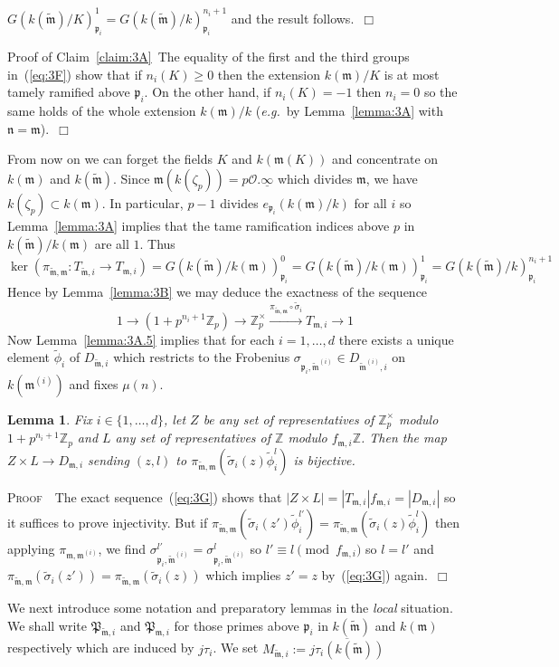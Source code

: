 \documentclass[12pt]{article}
\newtheorem{lemma}{Lemma}[section]
\newcounter{rem}[section]%
\newcommand{\bbZ}{\ensuremath{\mathbb{Z}}}
\newcommand{\beql}[1]{\begin{equation}\label{#1}}
\newcommand{\bPf}{\noindent \textsc{Proof\ }}
\newcommand{\cO}{\ensuremath{\mathcal{O}}}
\newcommand{\eeq}{\end{equation}}
\newcommand{\eg}{\emph{e.g.}}
\newcommand{\ePf}{\hspace*{\fill}~$\Box$\vertsp\par}%
\newcommand{\fm}{\ensuremath{\mathfrak{m}}}
\newcommand{\fn}{\ensuremath{\mathfrak{n}}}
\newcommand{\fp}{\ensuremath{\mathfrak{p}}}
\newcommand{\fP}{\ensuremath{\mathfrak{P}}}
\newcommand{\refeq}[1]{~(\ref{eq:#1})}
\newcommand{\rem}{\refstepcounter{rem}\noindent{\sc Remark \therem}}%
\renewcommand{\therem}{\thesection.\arabic{rem}}
\newcommand{\vertsp}{\vspace{1ex}}
\newcommand{\tfm}{\ensuremath{{\tilde{\fm}}}}
\newcommand{\Tmi}{\ensuremath{T_{\fm,i}}}
\newcommand{\Ttmi}{\ensuremath{T_{\tfm,i}}}
\newcommand{\tphi}{\ensuremath{\tilde{\phi}}}
\newcommand{\tsigma}{\ensuremath{\tilde{\sigma}}}
\newcommand{\uinf}{\ensuremath{{\underline{\infty}}}}
\begin{document}
$G(k(\tfm)/K)^1_{\fp_i}=G(k(\tfm)/k)^{n_i+1}_{\fp_i}$ and the result follows.\ePf
\noindent
{\sc Proof of Claim~\ref{claim:3A}}\
The equality of the first and the third groups in\refeq{3F} show that
if $n_i(K)\geq 0$ then the extension $k(\fm)/K$ is at most tamely ramified above $\fp_i$.
On the other hand, if $n_i(K)=-1$ then $n_i=0$ so the same holds of the whole extension
$k(\fm)/k$ (\eg\ by Lemma~\ref{lemma:3A} with $\fn=\fm$).\ePf
\noindent From now on we can forget the fields $K$ and $k(\fm(K))$ and concentrate
on $k(\fm)$ and $k(\tfm)$. Since $\fm(k(\zeta_p))=p\cO.\uinf$
which divides $\fm$, we have $k(\zeta_p)\subset k(\fm)$. In particular, $p-1$ divides
$e_{\fp_i}(k(\fm)/k)$ for all $i$ so
Lemma~\ref{lemma:3A} implies that the tame ramification
indices above $p$ in $k(\tfm)/k(\fm)$ are all $1$. Thus
\[
\ker(\pi_{\tfm,\fm}:\Ttmi\rightarrow\Tmi)=
G(k(\tfm)/k(\fm))^0_{\fp_i}=G(k(\tfm)/k(\fm))^1_{\fp_i}=
G(k(\tfm)/k)^{n_i+1}_{\fp_i}
\]
Hence by Lemma~\ref{lemma:3B} we may deduce the exactness of the sequence
\beql{eq:3G}
1\rightarrow (1+p^{n_i+1}\bbZ_p)\longrightarrow \bbZ_p^\times
\stackrel{\pi_{\tfm,\fm}\circ\tsigma_i}{\longrightarrow} \Tmi\rightarrow 1
\eeq
Now
Lemma~\ref{lemma:3A.5} implies that for each $i=1,\ldots,d$ there exists a unique element
$\tphi_i$ of $D_{\tfm,i}$ which restricts to
the Frobenius $\sigma_{\fp_i,\tfm^{(i)}}\in D_{\tfm^{(i)},i}$ on $k(\fm^{(i)})$
and fixes $\mu(n)$.
\begin{lemma}\label{lemma:3C.5}
Fix $i\in\{1,\ldots,d\}$, let $Z$ be any set of representatives
of $\bbZ_p^\times$ modulo $1+p^{n_i+1}\bbZ_p$ and $L$ any set of
representatives of  $\bbZ$ modulo $f_{\fm,i}\bbZ$.
Then the map $Z\times L\rightarrow D_{\fm,i}$ sending
$(z,l)$ to $\pi_{\tfm,\fm}(\tsigma_i(z)\tphi_i^l)$ is bijective.
\end{lemma}
\bPf\ The exact sequence\refeq{3G} shows that
$|Z\times L|=|\Tmi|f_{\fm,i}=|D_{\fm,i}|$ so it suffices to prove injectivity.
But if $\pi_{\tfm,\fm}(\tsigma_i(z')\tphi_i^{l'})=\pi_{\tfm,\fm}(\tsigma_i(z)\tphi_i^l)$ then
applying $\pi_{\fm,\fm^{(i)}}$, we find $\sigma_{\fp_i,\tfm^{(i)}}^{l'}=\sigma_{\fp_i,\tfm^{(i)}}^l$
so $l'\equiv l\pmod{f_{\fm,i}}$ so $l=l'$ and
$\pi_{\tfm,\fm}(\tsigma_i(z'))=\pi_{\tfm,\fm}(\tsigma_i(z))$
which implies $z'=z$ by\refeq{3G} again.\ePf
\noindent We next introduce some notation and preparatory lemmas
in the \emph{local} situation. We shall write $\fP_{\tfm,i}$ and
$\fP_{\fm,i}$ for those primes above $\fp_i$ in $k(\tfm)$ and $k(\fm)$ respectively
which are induced by $j\tau_i$. We set
$M_{\tfm,i}:=\overline{j\tau_i(k(\tfm))}$
\end{document}
